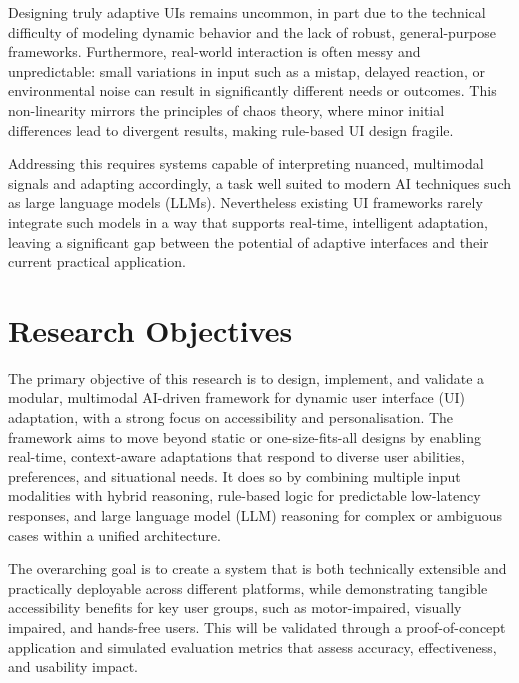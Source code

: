 \documentclass[openany]{book}
\begin{document}
Designing truly adaptive UIs remains uncommon, in part due to the technical difficulty of modeling dynamic behavior and the lack of robust, general-purpose frameworks. Furthermore, real-world interaction is often messy and unpredictable: small variations in input such as a mistap, delayed reaction, or environmental noise can result in significantly different needs or outcomes. This non-linearity mirrors the principles of chaos theory, where minor initial differences lead to divergent results, making rule-based UI design fragile.

Addressing this requires systems capable of interpreting nuanced, multimodal signals and adapting accordingly, a task well suited to modern AI techniques such as large language models (LLMs). Nevertheless existing UI frameworks rarely integrate such models in a way that supports real-time, intelligent adaptation, leaving a significant gap between the potential of adaptive interfaces and their current practical application.

\newpage

\section{Research Objectives}

The primary objective of this research is to design, implement, and validate a modular, multimodal AI-driven framework for dynamic user interface (UI) adaptation, with a strong focus on accessibility and personalisation. The framework aims to move beyond static or one-size-fits-all designs by enabling real-time, context-aware adaptations that respond to diverse user abilities, preferences, and situational needs. It does so by combining multiple input modalities with hybrid reasoning, rule-based logic for predictable low-latency responses, and large language model (LLM) reasoning for complex or ambiguous cases within a unified architecture.  

The overarching goal is to create a system that is both technically extensible and practically deployable across different platforms, while demonstrating tangible accessibility benefits for key user groups, such as motor-impaired, visually impaired, and hands-free users. This will be validated through a proof-of-concept application and simulated evaluation metrics that assess accuracy, effectiveness, and usability impact.
\end{document}
